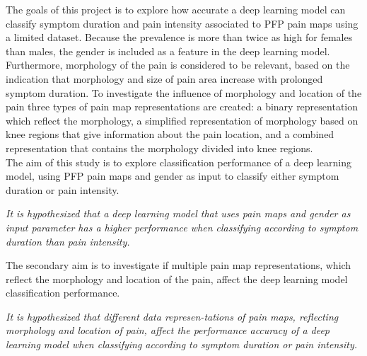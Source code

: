 \noindent
The goals of this project is to explore how accurate a deep learning model can classify symptom duration and pain intensity associated to PFP pain maps using a limited dataset. Because the prevalence is more than twice as high for females than males, the gender is included as a feature in the deep learning model. 
Furthermore, morphology of the pain is considered to be relevant, based on the indication that morphology and size of pain area increase with prolonged symptom duration. 
To investigate the influence of morphology and location of the pain three types of pain map representations are created: a binary representation which reflect the morphology, a simplified representation of morphology based on knee regions that give information about the pain location, and a combined representation that contains the morphology divided into knee regions.\\

\noindent
The aim of this study is to explore classification performance of a deep learning model, using PFP pain maps and gender as input to classify either symptom duration or pain intensity. 
\vspace{1mm}
\noindent
\begin{center}
\textit{It is hypothesized that a deep learning model that uses pain maps and gender as input parameter has a higher performance when classifying according to symptom duration than pain intensity.}
\end{center}

\noindent
The secondary aim is to investigate if multiple pain map representations, which reflect the morphology and location of the pain, affect the deep learning model classification performance.

\vspace{1mm}
\noindent
\begin{center}
\textit{It is hypothesized that different data represen-\newline tations of pain maps, reflecting morphology and location of pain, affect the performance
accuracy of a deep learning model when classifying according to symptom duration or pain intensity.
}
\end{center}

